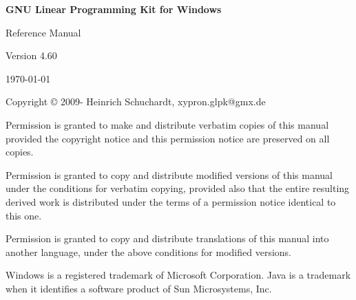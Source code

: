 \documentclass[a4paper,11pt]{report}
\newcommand{\glpkVersion}{4.60}
\begin{document}
\thispagestyle{empty}

\begin{center}

\vspace*{1in}

\begin{huge}
\sf\bfseries GNU Linear Programming Kit\linebreak
for Windows
\end{huge}

\vspace{0.5in}

\begin{LARGE}
\sf Reference Manual
\end{LARGE}

\vspace{0.5in}

\begin{LARGE}
\sf Version \glpkVersion
\end{LARGE}

\vspace{0.5in}
\begin{Large}
\sf \today
\end{Large}
\end{center}

\newpage

\vspace*{1in}

\vfill

\medskip \noindent
Copyright \copyright{} 2009-{\the\year} Heinrich Schuchardt, xypron.glpk@gmx.de

\medskip \noindent
Permission is granted to make and distribute verbatim copies of this
manual provided the copyright notice and this permission notice are
preserved on all copies.

\medskip \noindent
Permission is granted to copy and distribute modified versions of this
manual under the conditions for verbatim copying, provided also that the
entire resulting derived work is distributed under the terms of
a permission notice identical to this one.

\medskip \noindent
Permission is granted to copy and distribute translations of this manual
into another language, under the above conditions for modified versions.

\medskip \noindent
Windows is a registered trademark of Microsoft Corporation. Java is a 
trademark when it identifies a software product of Sun Microsystems, Inc.

\tableofcontents
\end{document}

